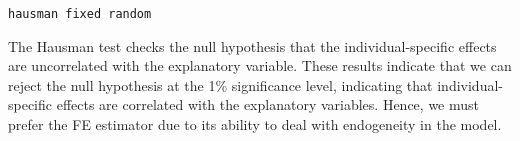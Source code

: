 
\newpage


\begin{verbatim}
hausman fixed random
\end{verbatim}


The Hausman test checks the null hypothesis that the individual-specific effects are uncorrelated with the explanatory variable. These results indicate that we can reject the null hypothesis at the 1\% significance level, indicating that individual-specific effects are correlated with the explanatory variables. Hence, we must prefer the FE estimator due to its ability to deal with endogeneity in the model.